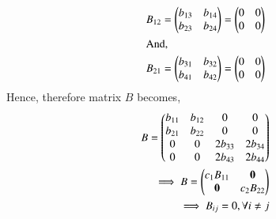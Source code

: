  \begin{align}
B_{12} =  \begin{pmatrix}
b_{13} & b_{14}\\ 
b_{23}  & b_{24}\\  
\end{pmatrix} =  \begin{pmatrix}
0 & 0\\ 
0  & 0 \\ 
\end{pmatrix}\\ 
\intertext{And,}
B_{21} =  \begin{pmatrix}
b_{31} & b_{32}\\
b_{41}  & b_{42} \\ 
\end{pmatrix}  =  \begin{pmatrix}
0 & 0\\ 
0  & 0  \\
\end{pmatrix} 
\end{align}
Hence, therefore matrix $B$ becomes,
\begin{align}
B =  \begin{pmatrix}
b_{11} & b_{12}  & 0       & 0 \\ 
b_{21} & b_{22}  & 0       & 0  \\
0      & 0       & 2b_{33} & 2b_{34}  \\
0      & 0       & 2b_{43} & 2b_{44}  \\  
\end{pmatrix}\\
\implies B =  \begin{pmatrix}
c_1B_{11} & \mathbf{0} \\ 
\mathbf{0}   & c_2B_{22} \\ 
\end{pmatrix}\\
\implies B_{ij} = 0, \forall i \neq j
\end{align}


